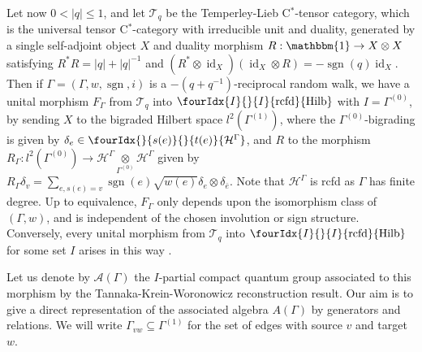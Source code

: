 \documentclass[10pt]{article}
\DeclareMathOperator{\id}{id}
\DeclareMathOperator{\rcf}{\mathrm{rcfd}}
\DeclareMathOperator{\sgn}{\mathrm{sgn}}
\newcommand{\Hsp}{\mathcal{H}}
\newcommand{\Hilb}{\mathrm{Hilb}}
\newcommand{\Hilbrcf}{\Gr{\mathrm{Hilb}}{I}{I}{}{\rcf}}
\newcommand{\Gr}[5]{\fourIdx{#2}{#4}{#3}{#5}{#1}}%
\newcommand{\Gru}[3]{\Gr{#1}{}{}{#2}{#3}}
\theoremstyle{definition}
\numberwithin{equation}{section}
\begin{document}
Let now $0<|q|\leq 1$, and let $\mathcal{T}_q$ be the Temperley-Lieb C$^*$-tensor category, which is the universal tensor C$^*$-category with irreducible unit and duality, generated by a single self-adjoint object $X$ and duality morphism $R: \mathbbm{1} \rightarrow  X\otimes X$ satisfying $R^*R= |q|+|q|^{-1}$ and $(R^*\otimes \id_X)(\id_X\otimes R) = -\sgn(q)\id_X$. Then if $\Gamma = (\Gamma,w,\sgn,i)$ is a $-(q+q^{-1})$-reciprocal random walk, we have a unital morphism $F_{\Gamma}$ from $\mathcal{T}_q$ into $\Hilbrcf$ with $I= \Gamma^{(0)}$, by sending $X$ to the bigraded Hilbert space  $l^2(\Gamma^{(1)})$, where the $\Gamma^{(0)}$-bigrading is given by $\delta_e \in \Gru{\Hsp^{\Gamma}}{s(e)}{t(e)}$, and $R$ to the morphism $R_{\Gamma}:l^2(\Gamma^{(0)})\rightarrow \Hsp^{\Gamma}\underset{\Gamma^{(0)}}{\otimes} \Hsp^{\Gamma}$ given by $R_{\Gamma} \delta_v =\sum_{e,s(e) = v} \sgn(e)\sqrt{w(e)}\delta_e \otimes \delta_{\bar{e}}.$ Note that $\Hsp^{\Gamma}$ is rcfd as $\Gamma$ has finite degree.  Up to equivalence, $F_{\Gamma}$ only depends upon the isomorphism class of $(\Gamma,w)$, and is independent of the chosen involution or sign structure. Conversely, every unital morphism from $\mathcal{T}_q$ into $\Gr{\Hilb}{I}{I}{}{\rcf}$ for some set $I$ arises in this way \cite{DCY2}.






Let us denote by $\mathscr{A}(\Gamma)$ the $I$-partial compact quantum group associated to this morphism by the Tannaka-Krein-Woronowicz reconstruction result. Our aim is to give a direct representation of the associated algebra $A(\Gamma)$ by generators and relations. We will write $\Gamma_{vw}\subseteq \Gamma^{(1)}$ for the set of edges with source $v$ and target $w$.
\end{document}
